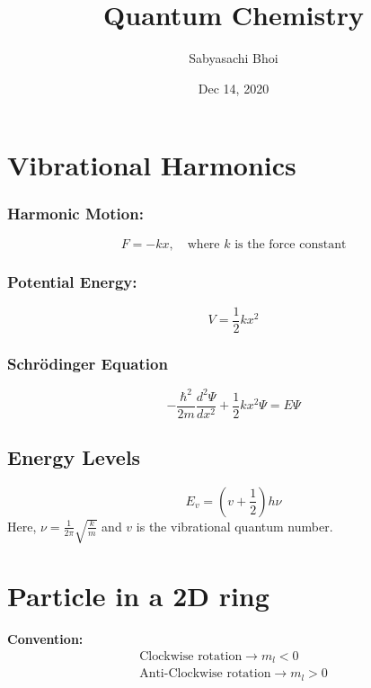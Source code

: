 \documentclass[12pt]{article}
\theoremstyle{definition}
\begin{document}
\title{Quantum Chemistry}
\author{Sabyasachi Bhoi}
\date{Dec 14, 2020}
\maketitle

\section{Vibrational Harmonics}

\subsubsection*{Harmonic Motion:} 

\begin{equation*}
	F = -kx, \quad \textrm{where $k$ is the force constant}
\end{equation*}

\subsubsection*{Potential Energy:} 
\begin{equation*}
	V = \frac{1}{2} kx^2
\end{equation*}

\subsubsection*{Schr\"odinger Equation}
\begin{equation*}
	- \frac{\hbar^2}{2m} \frac{d^2\Psi}{d x^2} + \frac{1}{2} kx^2\Psi = E\Psi
\end{equation*}

\subsection{Energy Levels}

\begin{equation*}
	E_v = \left( v + \frac{1}{2} \right) h\nu
\end{equation*}
Here, $\nu = \frac{1}{2\pi} \sqrt{\frac{k}{m}}$ and $v$ is the vibrational quantum number.

\section{Particle in a 2D ring}

\textbf{Convention:}
\begin{align*}
	\textrm{Clockwise rotation} \rightarrow m_l < 0\\
	\textrm{Anti-Clockwise rotation} \rightarrow m_l > 0\\
\end{align*}
\end{document}
